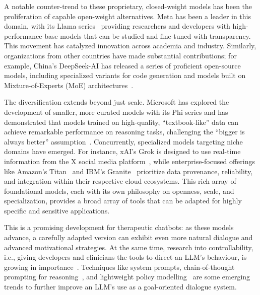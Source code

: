A notable counter-trend to these proprietary, closed-weight models has been the proliferation of capable open-weight alternatives. Meta has been a leader in this domain, with its Llama series~\cite{touvron2023llama} providing researchers and developers with high-performance base models that can be studied and fine-tuned with transparency. This movement has catalyzed innovation across academia and industry. Similarly, organizations from other countries have made substantial contributions; for example, China's DeepSeek-AI has released a series of proficient open-source models, including specialized variants for code generation and models built on Mixture-of-Experts (MoE) architectures~\cite{deepseek2024deepseekv2}.

The diversification extends beyond just scale. Microsoft has explored the development of smaller, more curated models with its Phi series and has demonstrated that models trained on high-quality, ``textbook-like'' data can achieve remarkable performance on reasoning tasks, challenging the ``bigger is always better'' assumption~\cite{li2023textbooks}. Concurrently, specialized models targeting niche domains have emerged. For instance, xAI's Grok is designed to use real-time information from the X social media platform~\cite{xai2023grok}, while enterprise-focused offerings like Amazon's Titan~\cite{aws2023titan} and IBM's Granite~\cite{ibm2023granite} prioritize data provenance, reliability, and integration within their respective cloud ecosystems. This rich array of foundational models, each with its  own philosophy on openness, scale, and specialization, provides a broad array of tools that can be adapted for highly specific and sensitive applications.

This is a promising development for therapeutic chatbots: as these models advance, a carefully adapted version can exhibit even more natural dialogue and advanced motivational strategies. At the same time, research into controllability, i.e., giving developers and clinicians the tools to direct an LLM's behaviour, is growing in importance~\cite{fernandez-etal-2025-lamia}. Techniques like system prompts, chain-of-thought prompting for reasoning~\cite{10.5555/3600270.3602070}, and lightweight policy modelling~\cite{du-etal-2024-rewarding} are some emerging trends to further improve an LLM's use as a goal-oriented dialogue system.


